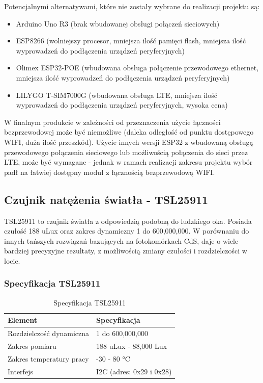 \documentclass[12pt,a4paper]{article}
\begin{document}
\noindent Potencjalnymi alternatywami, które nie zostały wybrane do realizacji projektu są:
\begin{itemize}
    \item Arduino Uno R3 (brak wbudowanej obsługi połączeń sieciowych)
    \item ESP8266 (wolniejszy procesor, mniejsza ilość pamięci flash, mniejsza ilość wyprowadzeń do podłączenia urządzeń peryferyjnych)
    \item Olimex ESP32-POE\cite{olimex-esp32poe} (wbudowana obsługa połączenie przewodowego ethernet, mniejsza ilość wyprowadzeń do podłączenia urządzeń peryferyjnych)
    \item LILYGO T-SIM7000G\cite{lilygo-esp32lte} (wbudowana obsługa LTE, mniejsza ilość wyprowadzeń do podłączenia urządzeń peryferyjnych, wysoka cena)
\end{itemize}

\noindent W finalnym produkcie w zależności od przeznaczenia użycie łączności bezprzewodowej może być niemożliwe (daleka odległość od punktu dostępowego WIFI, duża ilość przeszkód). Użycie innych wersji ESP32 z wbudowaną obsługą przewodowego połączenia sieciowego lub możliwością połączenia do sieci przez LTE, może być wymagane - jednak w ramach realizacji zakresu projektu wybór padł na łatwiej dostępny moduł z łącznością bezprzewodową WIFI.  

\subsection{Czujnik natężenia światła - TSL25911}

TSL25911 to czujnik światła z odpowiedzią podobną do ludzkiego oka. Posiada czułość 188 uLux oraz zakres dynamiczny 1 do 600,000,000. W porównaniu do innych tańszych rozwiązań bazujących na fotokomórkach CdS, daje o wiele bardziej precyzyjne rezultaty, z możliwością zmiany czułości i rozdzielczości w locie.

\subsubsection{Specyfikacja TSL25911}
\begin{table}[H]
    \centering
    \begin{tabular}{|l|l|}
        \hline
        Element & Specyfikacja \\
        \hline
        Rozdzielczość dynamiczna & 1 do 600,000,000 \\
        \hline
        Zakres pomiaru & 188 uLux - 88,000 Lux \\
        \hline
        Zakres temperatury pracy & -30 - 80 °C \\
        \hline
        Interfejs & I2C (adres: 0x29 i 0x28)\\
        \hline
    \end{tabular}
    \caption{Specyfikacja TSL25911}
    \label{tsl25911-spec}
\end{table}
\end{document}
